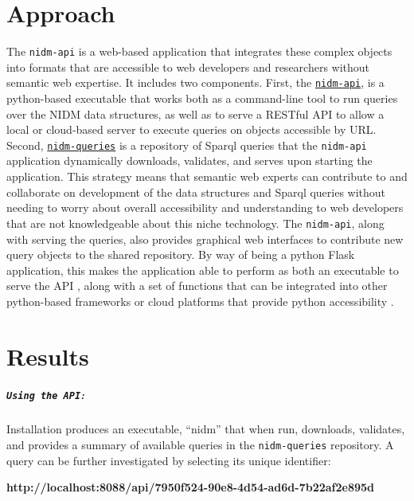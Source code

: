 \documentclass[twocolumn]{bmcart}%
\begin{document}
\section{Approach}\label{approach}
The \texttt{nidm-api} \cite{noauthor_undated-hq} is a web-based application that integrates these complex objects into formats that are accessible to web developers and researchers without semantic web expertise. It includes two components. First, the \href{https://github.com/incf-nidash/nidm-api}{\texttt{nidm-api}}, is a python-based executable that works both as a command-line tool to run queries over the NIDM data structures, as well as to serve a RESTful API to allow a local or cloud-based server to execute queries on objects accessible by URL. Second, \href{https://github.com/incf-nidash/nidm-queries}{\texttt{nidm-queries}} is a repository of Sparql queries that the \texttt{nidm-api} application dynamically downloads, validates, and serves upon starting the application. This strategy means that semantic web experts can contribute to and collaborate on development of the data structures and Sparql queries without needing to worry about overall accessibility and understanding to web developers that are not knowledgeable about this niche technology. The \texttt{nidm-api}, along with serving the queries, also provides graphical web interfaces to contribute new query objects to the shared repository. By way of being a python Flask \cite{noauthor_undated-ia} application, this makes the application able to perform as both an executable to serve the API \cite{noauthor_undated-ii}, along with a set of functions that can be integrated into other python-based frameworks \cite{noauthor_undated-ej} or cloud platforms that provide python accessibility \cite{noauthor_undated-jw}\cite{Google_undated-aj}. 

\section{Results}\label{results}
\subparagraph{\texorpdfstring{\texttt{Using the API}:}{:}}\label{section}
Installation produces an executable, “nidm” that when run, downloads, validates, and provides a summary of available queries in the \texttt{nidm-queries} repository. A query can be further investigated by selecting its unique identifier: \newline

\textbf{http://localhost:8088/api/7950f524-90e8-4d54-ad6d-7b22af2e895d}\newline
\end{document}
